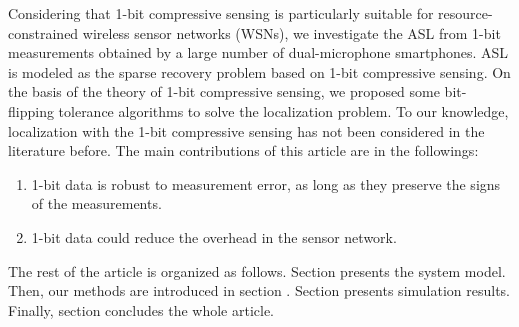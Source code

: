 Considering that 1-bit compressive sensing is particularly suitable for resource-constrained wireless sensor networks (WSNs), we investigate the ASL from 1-bit measurements obtained by a large number of dual-microphone smartphones.
ASL is modeled  as the sparse recovery problem based on 1-bit compressive sensing.
On the basis of the theory of 1-bit compressive sensing, we proposed some bit-flipping tolerance algorithms to solve the localization problem. To our knowledge, localization with the 1-bit compressive sensing has not been considered in the literature before.
The main contributions of this article are in the followings: 

\begin{enumerate}[(1)]
\item  1-bit data is robust to measurement error, as long as they preserve the signs of the measurements.

\item 1-bit data could reduce the overhead in the sensor network. 

\end{enumerate}

The rest of the article is organized as follows. Section \uppercase\expandafter{} presents the system model.
Then, our methods are introduced in section \uppercase\expandafter{}.
Section \uppercase\expandafter{} presents simulation results. 
Finally, section \uppercase\expandafter{} concludes the whole article.



